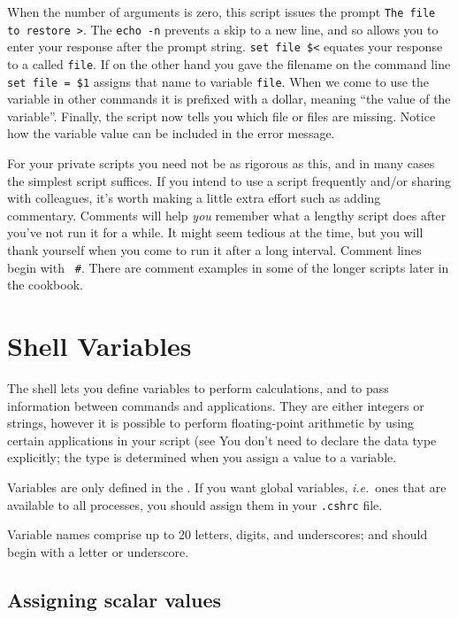 When the number of arguments is zero, this script issues the prompt
{\tt The file to restore >}.  The {\tt echo -n} prevents a skip to a
new line, and so allows you to enter your response after the prompt
string.  {\tt set file \$<} equates your response to a  called {\tt file}.  If on the other hand you gave the
filename on the command line {\tt set file = \$1} assigns that name to
variable {\tt file}.  When we come to use the variable in other commands
it is prefixed with a dollar, meaning ``the value of the variable''.
Finally, the script now tells you which file or files are missing.
Notice how the variable value can be included in the error message.

For your private scripts you need not be as rigorous as this, and in
many cases the simplest script suffices.  If you intend to use a script
frequently and/or sharing with colleagues, it's worth making a little
extra effort such as adding commentary.  Comments will help {\em you\/}
remember what a lengthy script does after you've not run it for a while.
It might seem tedious at the time, but you will thank yourself when you
come to run it after a long interval.  Comment lines begin with {\tt
\#}.  There are comment examples in some of the longer scripts later in
the cookbook.

\newpage
\section{Shell Variables\label{sc4_se_variables}}

The shell lets you define variables to perform calculations, and to
pass information between commands and applications.  They are either
integers or strings, however it is possible to perform floating-point
arithmetic by using certain applications in your script (see
You don't need to declare the data type explicitly; the type is
determined when you assign a value to a variable.

Variables are only defined in the .  If you want global variables, {\it i.e.}\ ones
that are available to all processes, you should assign them in your
{\tt .cshrc} file.

Variable names comprise up to 20 letters, digits, and underscores;
and should begin with a letter or underscore.

\subsection{Assigning scalar values
\label{sc4_se_assign_scalar}}

